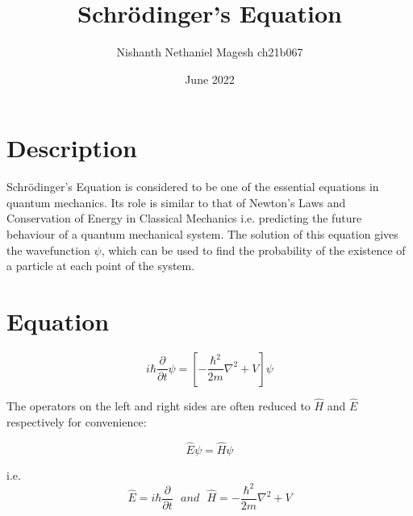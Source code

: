 


\title{Schrödinger's Equation}
\author{Nishanth Nethaniel Magesh ch21b067}
\date{June 2022}

% 

\maketitle

\section{Description}

Schrödinger's Equation is considered to be one of the essential equations in quantum mechanics. Its role is similar to that of Newton's Laws and Conservation of Energy in Classical Mechanics i.e. predicting the future behaviour of a quantum mechanical system. The solution of this equation gives the wavefunction $\psi$, which can be used to find the probability of the existence of a particle at each point of the system.

\section{Equation}

\begin{equation}
    i\hbar\frac{\partial}{\partial t}\psi=[-\frac{\hbar^2}{2m}\nabla^2+V]\psi
\end{equation}

The operators on the left and right sides are often reduced to $\hat{H}$  and $\hat{E}$ respectively for convenience:

\begin{equation}
    \hat{E}\psi=\hat{H}\psi
\end{equation}

i.e.$$ \hat{E}=i\hbar\frac{\partial}{\partial t} \:\:\:and\:\:\:\hat{H}= -\frac{\hbar^2}{2m} \nabla^2+V $$

